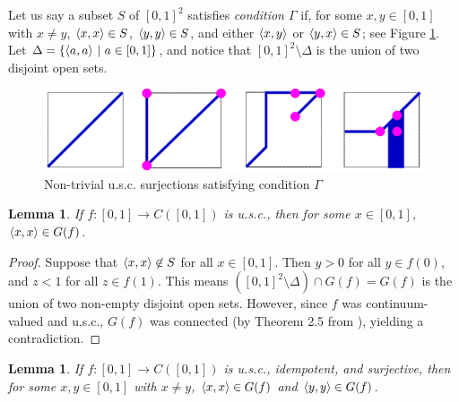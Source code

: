 \documentclass{amsart}
\newtheorem{lemma}[theorem]{Lemma}
\theoremstyle{definition}
\begin{document}
Let us say a subset $S$ of $[0,1]^2$ satisfies \textit{condition $\Gamma$} if, for some $x, y \in [0,1]$ with $x \ne y$, $\langle x,x\rangle \in S$, $\langle y,y\rangle \in S$, and either $\langle x,y\rangle$ or $\langle y,x\rangle \in S$; see Figure \ref{conditionGamma}. Let $\Delta = \{\langle a,a\rangle \ | \ a \in [0,1]\}$, and notice that $[0,1]^2 \setminus \Delta$ is the union of two disjoint open sets.

\begin{figure}
\begin{center}
\includegraphics[width=\linewidth]{idempotent_usc_4.pdf}
\end{center}
\caption{Non-trivial u.s.c. surjections satisfying condition $\Gamma$}
\label{conditionGamma}
\end{figure}

\begin{lemma} \label{first lemma}
If $f: [0,1] \rightarrow C([0,1])$ is u.s.c., then for some $x \in [0,1]$, $\langle x,x\rangle \in G(f)$.
\end{lemma}

\begin{proof}
Suppose that $\langle x,x\rangle \not\in S$ for all $x \in [0,1]$. Then $y > 0$ for all $y \in f(0)$, and $z < 1$ for all $z \in f(1)$. This means $([0,1]^2 \setminus \Delta) \cap G(f) = G(f)$ is the union of two non-empty disjoint open sets. However, since $f$ was continuum-valued and u.s.c., $G(f)$ was connected (by Theorem 2.5 from \cite{ingram intro}), yielding a contradiction.
\end{proof}

\begin{lemma}
If $f: [0,1] \rightarrow C([0,1])$ is u.s.c., idempotent, and surjective, then for some $x, y \in [0,1]$ with $x \not= y$, $\langle x,x\rangle \in G(f)$ and $\langle y,y\rangle \in G(f)$.
\end{lemma}
\end{document}
